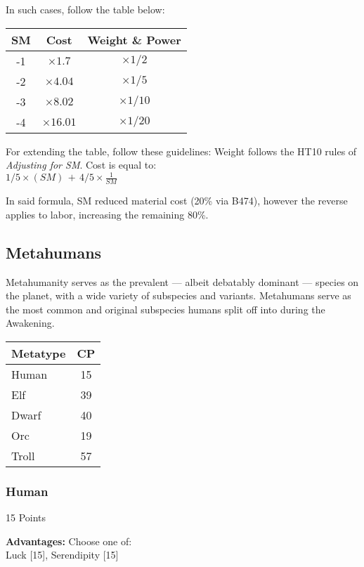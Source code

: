 \begin{multicols*}{3}
	In such cases, follow the table below:
	
	\begin{center}
		\begin{tabular}{|c|c|c|}
			\hline
			SM & Cost & Weight \& Power \\
			\hline
			\hline
			-1 & $\times1.7$ & $\times1/2$ \\
			-2 & $\times4.04$ & $\times1/5$ \\
			-3 & $\times8.02$ & $\times1/10$ \\
			-4 & $\times16.01$ & $\times1/20$ \\
			\hline
		\end{tabular}
	\end{center}

	\begin{center}
		For extending the table, follow these guidelines: Weight follows the HT10 rules of \textit{Adjusting for SM}. Cost is equal to:\\ $1/5\times(SM)\,+\,4/5\times\frac{1}{SM}$
	\end{center}
	
	In said formula, SM reduced material cost (20\% via B474), however the reverse applies to labor, increasing the remaining 80\%.
	
	\subsection{Metahumans}
	
	Metahumanity serves as the prevalent — albeit debatably dominant — species on the planet, with a wide variety of subspecies and variants. Metahumans serve as the most common and original subspecies humans split off into during the Awakening.
	
	\begin{center}
		\begin{tabularx}{0.32\textwidth}{|X|c|}
			\hline
			Metatype & CP \\
			\hline
			\hline
			Human & 15 \\
			Elf & 39 \\
			Dwarf & 40 \\
			Orc & 19 \\
			Troll & 57 \\
			\hline
		\end{tabularx}
	\end{center}
	
	\subsubsection*{Human}
	\begin{flushright}
		15 Points
	\end{flushright}
	\textbf{Advantages:} 
	Choose one of: \\
	Luck [15], Serendipity [15]
	

\end{multicols*}
